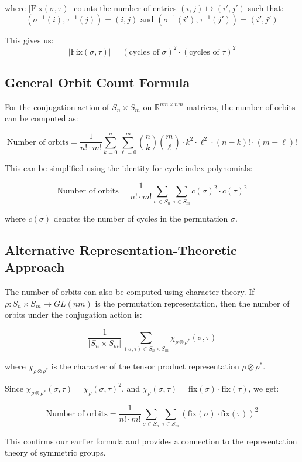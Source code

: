\documentclass[11pt]{article}
\begin{document}
where $|\text{Fix}(\sigma, \tau)|$ counts the number of entries $(i,j) \mapsto (i',j')$ such that:
\[
(\sigma^{-1}(i), \tau^{-1}(j)) = (i,j) \text{ and } (\sigma^{-1}(i'), \tau^{-1}(j')) = (i',j')
\]

This gives us:
\[
|\text{Fix}(\sigma, \tau)| = (\text{cycles of } \sigma)^2 \cdot (\text{cycles of } \tau)^2
\]

\subsection{General Orbit Count Formula}

For the conjugation action of $S_n \times S_m$ on $\mathbb{R}^{nm \times nm}$ matrices, the number of orbits can be computed as:

\[
\text{Number of orbits} = \frac{1}{n! \cdot m!} \sum_{k=0}^n \sum_{\ell=0}^m \binom{n}{k} \binom{m}{\ell} \cdot k^2 \cdot \ell^2 \cdot (n-k)! \cdot (m-\ell)!
\]

This can be simplified using the identity for cycle index polynomials:

\[
\text{Number of orbits} = \frac{1}{n! \cdot m!} \sum_{\sigma \in S_n} \sum_{\tau \in S_m} c(\sigma)^2 \cdot c(\tau)^2
\]

where $c(\sigma)$ denotes the number of cycles in the permutation $\sigma$.

\subsection{Alternative Representation-Theoretic Approach}

The number of orbits can also be computed using character theory. If $\rho: S_n \times S_m \to GL(nm)$ is the permutation representation, then the number of orbits under the conjugation action is:

\[
\frac{1}{|S_n \times S_m|} \sum_{(\sigma,\tau) \in S_n \times S_m} \chi_{\rho \otimes \rho^*}(\sigma, \tau)
\]

where $\chi_{\rho \otimes \rho^*}$ is the character of the tensor product representation $\rho \otimes \rho^*$.

Since $\chi_{\rho \otimes \rho^*}(\sigma, \tau) = \chi_\rho(\sigma, \tau)^2$, and $\chi_\rho(\sigma, \tau) = \text{fix}(\sigma) \cdot \text{fix}(\tau)$, we get:

\[
\text{Number of orbits} = \frac{1}{n! \cdot m!} \sum_{\sigma \in S_n} \sum_{\tau \in S_m} (\text{fix}(\sigma) \cdot \text{fix}(\tau))^2
\]

This confirms our earlier formula and provides a connection to the representation theory of symmetric groups.
\end{document}
